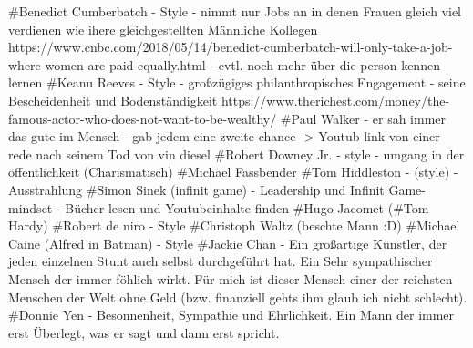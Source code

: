 #Benedict Cumberbatch
    - Style 
    - nimmt nur Jobs an in denen Frauen gleich viel verdienen wie ihere gleichgestellten Männliche Kollegen https://www.cnbc.com/2018/05/14/benedict-cumberbatch-will-only-take-a-job-where-women-are-paid-equally.html
    - evtl. noch mehr über die person kennen lernen 
#Keanu Reeves
    - Style 
    - großzügiges philanthropisches Engagement
    - seine Bescheidenheit und Bodenständigkeit https://www.therichest.com/money/the-famous-actor-who-does-not-want-to-be-wealthy/
#Paul Walker
    - er sah immer das gute im Mensch 
    - gab jedem eine zweite chance -> Youtub link von einer rede nach seinem Tod von vin diesel 
#Robert Downey Jr. 
    - style
    - umgang in der öffentlichkeit (Charismatisch)
#Michael Fassbender
#Tom Hiddleston 
    - (style)
    - Ausstrahlung
#Simon Sinek (infinit game)
    - Leadership und Infinit Game-mindset
    - Bücher lesen und Youtubeinhalte finden 
#Hugo Jacomet
(#Tom Hardy)
#Robert de niro
    - Style 
#Christoph Waltz (beschte Mann :D)
#Michael Caine (Alfred in Batman)
    - Style
#Jackie Chan
    - Ein großartige Künstler, der jeden einzelnen Stunt auch selbst durchgeführt hat. Ein Sehr sympathischer Mensch der immer föhlich wirkt.
      Für mich ist dieser Mensch einer der reichsten Menschen der Welt ohne Geld (bzw. finanziell gehts ihm glaub ich nicht schlecht).
#Donnie Yen   
    - Besonnenheit, Sympathie und Ehrlichkeit. Ein Mann der immer erst Überlegt, was er sagt und dann erst spricht.